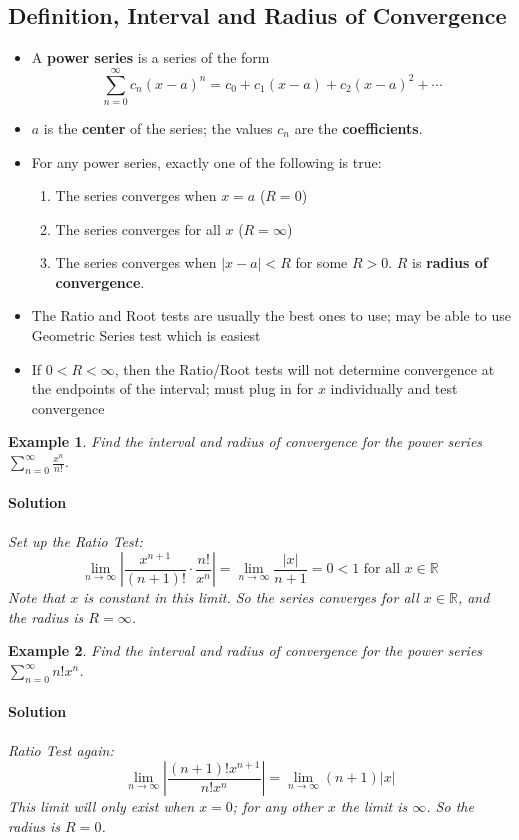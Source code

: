 \documentclass[letterpaper, 11pt, openany]{book}
\theoremstyle{mytheoremstyle}
\theoremstyle{myexamplestyle}
\newtheorem{example}{Example}[section]
\newenvironment{solution}{\paragraph{\sffamily \smaller \fontseries{b}\selectfont Solution}}{\hfill\faSquare}
\begin{document}
\subsection{Definition, Interval and Radius of Convergence}
\begin{itemize}
    \item A \textbf{power series} is a series of the form
    \[\sum_{n = 0}^{\infty} c_{n} \left( x  - a \right)^{n} = c_{0} + c_{1}(x - a) + c_{2}(x - a)^{2} + \cdots    \]
    \item $a$ is the \textbf{center} of the series; the values $c_{n}$ are the \textbf{coefficients}.
    \item For any power series, exactly one of the following is true:
    \begin{enumerate}
        \item The series converges when $x = a$ \faMeh \; ($R = 0$)
        \item The series converges for all $x$ ($R = \infty$)
        \item The series converges when $|x-a| < R$ for some $R > 0$. $R$ is \textbf{radius of convergence}.
    \end{enumerate}
    \item The Ratio and Root tests are usually the best ones to use; may be able to use Geometric Series test which is easiest \faSmile
    \item[{\faExclamationCircle[solid]}] If $0 < R < \infty$, then the Ratio/Root tests will not determine convergence at the endpoints of the interval; must plug in for $x$ individually and test convergence
\end{itemize}

\begin{example}\label{e:powseriesexp}
    Find the interval and radius of convergence for the power series $\displaystyle \sum_{n=0}^{\infty} \frac{x^{n}}{n!}$.
    \begin{solution}
        Set up the Ratio Test:
        \[\lim_{n \to \infty} \left| \frac{x^{n+1}}{(n+1)!} \cdot \frac{n!}{x^{n}} \right| = \lim_{n \to \infty} \frac{|x|}{n+1} = 0 < 1 \text{ for all } x \in \mathbb{R}\]
        Note that $x$ is constant in this limit. So the series converges for all $x \in \mathbb{R}$, and the radius is $R = \infty$.
    \end{solution}
\end{example}

\begin{example}\label{e:powserieszerorad}
    Find the interval and radius of convergence for the power series $\displaystyle \sum_{n=0}^{\infty} n! x^{n}$.
    \begin{solution}
        Ratio Test again:
        \[\lim_{n \to \infty} \left| \frac{(n+1)!x^{n+1}}{n! x^{n}} \right| = \lim_{n \to \infty} (n+1)|x|\]
        This limit will only exist when $x=0$; for any other $x$ the limit is $\infty$. So the radius is $R=0$.
    \end{solution}
\end{example}
\end{document}
